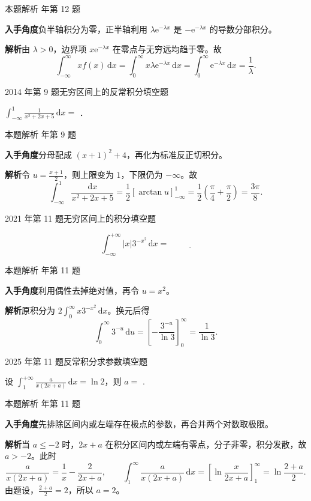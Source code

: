 \documentclass[UTF8,zihao=-4,fontset=fandol]{ctexart}
\newcommand{\blank}{\underline{\hspace{5em}}}
\newcommand{\QuestionPage}[6]{%
  \par\noindent\begin{minipage}{\linewidth}
  \raggedright
  {\small\textcolor{black!60}{#3\quad #5}\hfill\textcolor{accent}{#2}}\par\smallskip}
\newcommand{\QuestionEnd}{\end{minipage}\par\medskip}
\newcommand{\QuestionPage}[6]{%
  \clearpage
  {\small\textcolor{accent}{#1\hfill #2}}\par\medskip
  {\small\textcolor{black!60}{#3\quad #5\hfill #6}}\par\vspace{9bp}}
\newcommand{\QuestionEnd}{}
\newenvironment{QuestionSolution}[1]{%
  \clearpage
  {\small\textcolor{black!60}{本题解析\quad #1}}\par\medskip
}{\par\clearpage}
\begin{document}
\begin{QuestionSolution}{2011 年第 12 题}
\textbf{入手角度}\quad 负半轴积分为零，正半轴利用 \(\lambda \mathrm{e}^{-\lambda x}\) 是 \(-\mathrm{e}^{-\lambda x}\) 的导数分部积分。

\textbf{解析}\quad 由 \(\lambda>0\)，边界项 \(x\mathrm{e}^{-\lambda x}\) 在零点与无穷远均趋于零。故
\[
\int_{-\infty}^\infty xf(x)\,\mathrm{d}x
=\int_0^\infty x\lambda \mathrm{e}^{-\lambda x}\,\mathrm{d}x
=\int_0^\infty \mathrm{e}^{-\lambda x}\,\mathrm{d}x
=\boxed{\frac1\lambda}.
\]
\end{QuestionSolution}

\QuestionPage{3.5 反常积分}{填空题}{2014 年第 9 题}{2}{无穷区间上的反常积分}{198 / 234}
$\int_{-\infty}^{1} \frac{1}{x^2 + 2x + 5}\,\mathrm{d} x =$ \blank{}．
\QuestionEnd

\begin{QuestionSolution}{2014 年第 9 题}
\textbf{入手角度}\quad 分母配成 \((x+1)^2+4\)，再化为标准反正切积分。

\textbf{解析}\quad 令 \(u=\frac{x+1}{2}\)，则上限变为 \(1\)，下限仍为 \(-\infty\)。故
\[
\int_{-\infty}^1\frac{\mathrm{d}x}{x^2+2x+5}
=\frac12[\arctan u]_{-\infty}^1
=\frac12\left(\frac\pi4+\frac\pi2\right)
=\boxed{\frac{3\pi}{8}}.
\]
\end{QuestionSolution}

\QuestionPage{3.5 反常积分}{填空题}{2021 年第 11 题}{2}{无穷区间上的积分}{199 / 234}
\[\int_{-\infty}^{+\infty} |x|3^{-x^2}\,\mathrm{d}x= \blank{}
\]
\QuestionEnd

\begin{QuestionSolution}{2021 年第 11 题}
\textbf{入手角度}\quad 利用偶性去掉绝对值，再令 \(u=x^2\)。

\textbf{解析}\quad 原积分为 \(2\int_0^\infty x3^{-x^2}\,\mathrm{d}x\)。换元后得
\[
\int_0^\infty 3^{-u}\,\mathrm{d}u
=\left[-\frac{3^{-u}}{\ln3}\right]_0^\infty
=\boxed{\frac1{\ln3}}.
\]
\end{QuestionSolution}

\QuestionPage{3.5 反常积分}{填空题}{2025 年第 11 题}{2}{反常积分求参数}{200 / 234}
设 \(\int_{1}^{+\infty} \frac{a}{x\left( 2x + a \right)} \,\mathrm{d} x = \ln 2\)，则 \(a =\) \blank{}.
\QuestionEnd

\begin{QuestionSolution}{2025 年第 11 题}
\textbf{入手角度}\quad 先排除区间内或左端存在极点的参数，再合并两个对数取极限。

\textbf{解析}\quad 当 \(a\le-2\) 时，\(2x+a\) 在积分区间内或左端有零点，分子非零，积分发散，故 \(a>-2\)。此时
\[
\frac{a}{x(2x+a)}=\frac1x-\frac{2}{2x+a},\qquad
\int_1^\infty \frac{a}{x(2x+a)}\,\mathrm{d}x
=\left[\ln\frac{x}{2x+a}\right]_1^\infty
=\ln\frac{2+a}{2}.
\]
由题设，\(\frac{2+a}{2}=2\)，所以 \(a=\boxed{2}\)。
\end{QuestionSolution}
\end{document}

